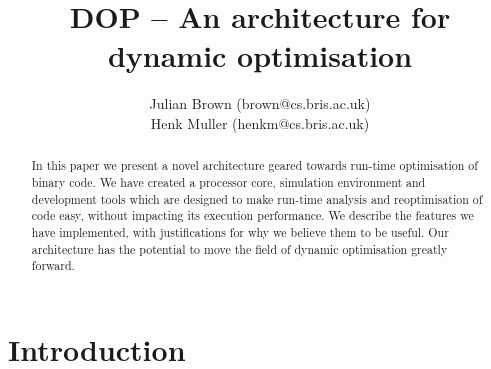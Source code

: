 \documentclass[11pt,letterpaper,twocolumn,notitlepage]{article}
\begin{document}
\title{DOP -- An architecture for dynamic optimisation}
\author{Julian Brown (brown@cs.bris.ac.uk)\\Henk Muller (henkm@cs.bris.ac.uk)}
\maketitle




\newenvironment{code}
  {\begin{list}{}{
    \setlength{\rightmargin}{\leftmargin}
    \raggedright
    \setlength{\itemsep}{0pt}
    \setlength{\parsep}{0pt}
    \ttfamily}%
   \item[]}
  {\end{list}}





% 



% 
%



\cleardoublepage	%



\begin{abstract}
In this paper we present a novel architecture geared towards run-time optimisation of binary code. We have created a processor core, simulation environment and development tools which are designed to make run-time analysis and reoptimisation of code easy, without impacting its execution performance. We describe the features we have implemented, with justifications for why we believe them to be useful. Our architecture has the potential to move the field of dynamic optimisation greatly forward.
\end{abstract}

\section{Introduction}
\end{document}
